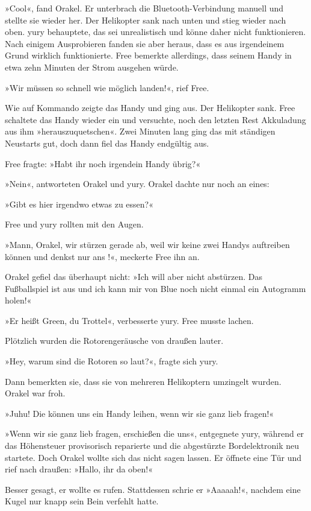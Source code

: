 »Cool«, fand Orakel. Er unterbrach die Bluetooth-Verbindung manuell und stellte sie wieder her. Der Helikopter sank nach unten und stieg wieder nach oben. yury behauptete, das sei unrealistisch und könne daher nicht funktionieren. Nach einigem Ausprobieren fanden sie aber heraus, dass es aus irgendeinem Grund wirklich funktionierte. Free bemerkte allerdings, dass seinem Handy in etwa zehn Minuten der Strom ausgehen würde.

»Wir müssen so schnell wie möglich landen!«, rief Free.

Wie auf Kommando zeigte das Handy  und ging aus. Der Helikopter sank. Free schaltete das Handy wieder ein und versuchte, noch den letzten Rest Akkuladung aus ihm »herauszuquetschen«. Zwei Minuten lang ging das mit ständigen Neustarts gut, doch dann fiel das Handy endgültig aus.

Free fragte: »Habt ihr noch irgendein Handy übrig?«

»Nein«, antworteten Orakel und yury. Orakel dachte nur noch an eines:

»Gibt es hier irgendwo etwas zu essen?«

Free und yury rollten mit den Augen.

»Mann, Orakel, wir stürzen gerade ab, weil wir keine zwei Handys auftreiben können und  denkst nur ans !«, meckerte Free ihn an.

Orakel gefiel das überhaupt nicht: »Ich will aber nicht abstürzen. Das Fußballspiel ist aus und ich kann mir von Blue noch nicht einmal ein Autogramm holen!«

»Er heißt Green, du Trottel«, verbesserte yury. Free musste lachen.

Plötzlich wurden die Rotorengeräusche von draußen lauter.

»Hey, warum sind die Rotoren so laut?«, fragte sich yury.

Dann bemerkten sie, dass sie von mehreren Helikoptern umzingelt wurden. Orakel war froh.

»Juhu! Die können uns ein Handy leihen, wenn wir sie ganz lieb fragen!«

»Wenn wir sie ganz lieb fragen, erschießen die uns«, entgegnete yury, während er das Höhensteuer provisorisch reparierte und die abgestürzte Bordelektronik neu startete. Doch Orakel wollte sich das nicht sagen lassen. Er öffnete eine Tür und rief nach draußen: »Hallo, ihr da oben!«

Besser gesagt, er wollte es rufen. Stattdessen schrie er »Aaaaah!«, nachdem eine Kugel nur knapp sein Bein verfehlt hatte.

